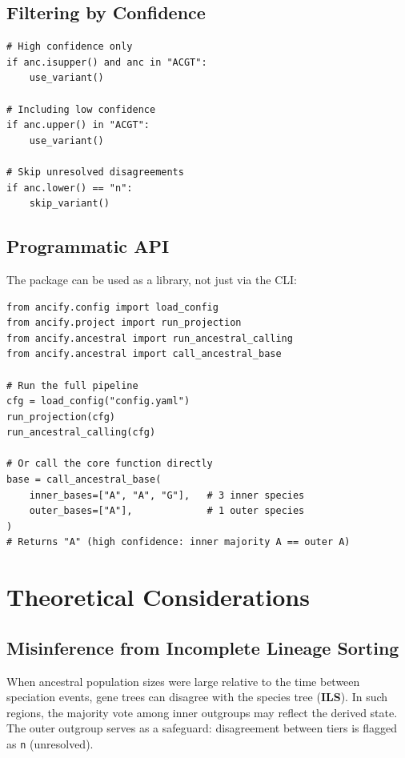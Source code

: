 \documentclass[11pt,a4paper]{article}
\begin{document}
\subsection{Filtering by Confidence}

\begin{lstlisting}[caption={Confidence-level filtering.}]
# High confidence only
if anc.isupper() and anc in "ACGT":
    use_variant()

# Including low confidence
if anc.upper() in "ACGT":
    use_variant()

# Skip unresolved disagreements
if anc.lower() == "n":
    skip_variant()
\end{lstlisting}

\subsection{Programmatic API}

The package can be used as a library, not just via the CLI:

\begin{lstlisting}[caption={Using the package programmatically.}]
from ancify.config import load_config
from ancify.project import run_projection
from ancify.ancestral import run_ancestral_calling
from ancify.ancestral import call_ancestral_base

# Run the full pipeline
cfg = load_config("config.yaml")
run_projection(cfg)
run_ancestral_calling(cfg)

# Or call the core function directly
base = call_ancestral_base(
    inner_bases=["A", "A", "G"],   # 3 inner species
    outer_bases=["A"],             # 1 outer species
)
# Returns "A" (high confidence: inner majority A == outer A)
\end{lstlisting}


\section{Theoretical Considerations}
\label{sec:theory}

\subsection{Misinference from Incomplete Lineage Sorting}

When ancestral population sizes were large relative to the time between speciation events, gene trees can disagree with the species tree (\textbf{ILS}).  In such regions, the majority vote among inner outgroups may reflect the derived state.  The outer outgroup serves as a safeguard: disagreement between tiers is flagged as \texttt{n} (unresolved).
\end{document}
